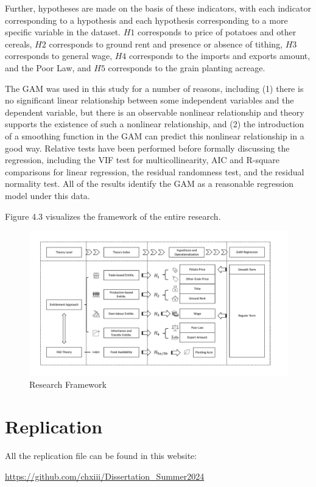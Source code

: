 Further, hypotheses are made on the basis of these indicators, with each indicator corresponding to a hypothesis and each hypothesis corresponding to a more specific variable in the dataset. $H1$ corresponds to price of potatoes and other cereals, $H2$ corresponds to ground rent and presence or absence of tithing, $H3$ corresponds to general wage, $H4$ corresponds to the imports and exports amount, and the Poor Law, and $H5$ corresponds to the grain planting acreage.

The GAM was used in this study for a number of reasons, including (1) there is no significant linear relationship between some independent variables and the dependent variable, but there is an observable nonlinear relationship and theory supports the existence of such a nonlinear relationship, and (2) the introduction of a smoothing function in the GAM can predict this nonlinear relationship in a good way. Relative tests have been performed before formally discussing the regression, including the VIF test for multicollinearity, AIC and R-square comparisons for linear regression, the residual randomness test, and the residual normality test. All of the results identify the GAM as a reasonable regression model under this data.

Figure 4.3 visualizes the framework of the entire research.

\begin{landscape}
    \begin{figure}[h]
        \centering
        \caption{Research Framework}
        \includegraphics[width=1.5\textheight]{../03_outputs/Framework.pdf}
    \end{figure}
\end{landscape}




\section{Replication}
All the replication file can be found in this website:

\url{https://github.com/chxiii/Dissertation_Summer2024}



